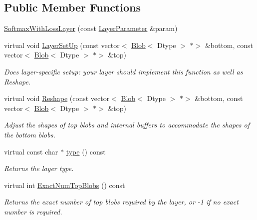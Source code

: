 \subsection*{Public Member Functions}
\begin{DoxyCompactItemize}
\item 
\mbox{\hyperlink{classcaffe_1_1_softmax_with_loss_layer_ac3a01d6846a9b62c1790635d53185e81}{Softmax\+With\+Loss\+Layer}} (const \mbox{\hyperlink{classcaffe_1_1_layer_parameter}{Layer\+Parameter}} \&param)
\item 
virtual void \mbox{\hyperlink{classcaffe_1_1_softmax_with_loss_layer_a96cd04896d4b805fcaf36c2c6522ae10}{Layer\+Set\+Up}} (const vector$<$ \mbox{\hyperlink{classcaffe_1_1_blob}{Blob}}$<$ Dtype $>$ $\ast$$>$ \&bottom, const vector$<$ \mbox{\hyperlink{classcaffe_1_1_blob}{Blob}}$<$ Dtype $>$ $\ast$$>$ \&top)
\begin{DoxyCompactList}\small\item\em Does layer-\/specific setup\+: your layer should implement this function as well as Reshape. \end{DoxyCompactList}\item 
virtual void \mbox{\hyperlink{classcaffe_1_1_softmax_with_loss_layer_a2821b89b0f46a5e2ddaccb2708ab237b}{Reshape}} (const vector$<$ \mbox{\hyperlink{classcaffe_1_1_blob}{Blob}}$<$ Dtype $>$ $\ast$$>$ \&bottom, const vector$<$ \mbox{\hyperlink{classcaffe_1_1_blob}{Blob}}$<$ Dtype $>$ $\ast$$>$ \&top)
\begin{DoxyCompactList}\small\item\em Adjust the shapes of top blobs and internal buffers to accommodate the shapes of the bottom blobs. \end{DoxyCompactList}\item 
\mbox{\label{classcaffe_1_1_softmax_with_loss_layer_a79aad991f6c56097068ccca031f1288a}} 
virtual const char $\ast$ \mbox{\hyperlink{classcaffe_1_1_softmax_with_loss_layer_a79aad991f6c56097068ccca031f1288a}{type}} () const
\begin{DoxyCompactList}\small\item\em Returns the layer type. \end{DoxyCompactList}\item 
virtual int \mbox{\hyperlink{classcaffe_1_1_softmax_with_loss_layer_a9035d000b2ce51a973f255a5eb2df8e3}{Exact\+Num\+Top\+Blobs}} () const
\begin{DoxyCompactList}\small\item\em Returns the exact number of top blobs required by the layer, or -\/1 if no exact number is required. \end{DoxyCompactList}\item 

\end{DoxyCompactItemize}

